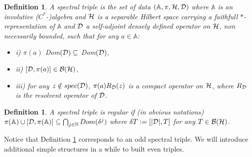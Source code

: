 \documentclass[a4paper,11pt,twoside]{article}
\numberwithin{equation}{section}
\newtheorem{definition}[Theorem]{Definition}
\theoremstyle{nonumberplain}
\begin{document}
\begin{definition}\label{spect-triple}
A spectral triple is the set of data $(\mathbb{A},\pi,{\cal{H}},{\cal{D}})$ where $\mathbb{A}$ is an involutive ($C^*$-)algebra and ${\cal{H}}$ is a separable Hilbert space carrying a faithfull $*$-representation of $\mathbb{A}$ and  ${\cal{D}}$ a self-adjoint densely defined operator on ${\cal{H}}$, non necessarily bounded, such that for any $a\in\mathbb{A}$:
\begin{itemize}
\vspace*{-3pt}
\setlength{\itemsep}{-1pt}
\item i) $\pi(a)$ Dom$({\cal{D}})\subseteq$ Dom$({\cal{D}})$,
\item ii) $[{\cal{D}},\pi(a)]\in{\cal{B}}({\cal{H}})$,
\item iii) for any $z\notin spec({\cal{D}})$, $\pi(a)R_{{\cal{D}}}(z)$ is a compact operator on ${\cal{H}}$, where $R_{{\cal{D}}}$ is the resolvent operator of ${\cal{D}}$.
\end{itemize}
\end{definition}

\begin{definition}\label{def-regular}
A spectral triple is regular if (in obvious notations) $\pi(\mathbb{A})\cup[{\cal{D}},\pi(\mathbb{A})]\subseteq\bigcap_{j\in\mathbb{N}}Dom(\delta^j)$ where $\delta T:=[|{\cal{D}}|,T]$ for any $T\in{\cal{B}}({\cal{H}})$.
\end{definition}
Notice that Definition \ref{spect-triple} corresponds to an odd spectral triple. We will introduce additional simple structures in a while to built even triples.\par
\end{document}
